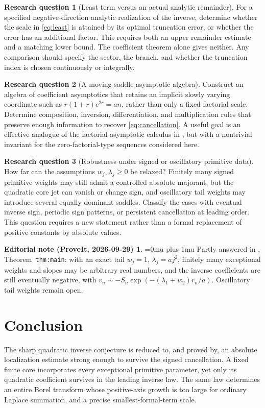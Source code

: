 \documentclass[11pt,a4paper]{article}
\numberwithin{equation}{section}
\theoremstyle{definition}\newtheorem{definition}[theorem]{Definition}
\newtheorem{question}{Research question}
\theoremstyle{remark}\newtheorem{remark}[theorem]{Remark}
\theoremstyle{definition}
\newtheorem*{ednoteinner}{Editorial note (ProveIt, 2026-09-29)}
\newenvironment{ednote}{\begin{ednoteinner}\sloppy\Urlmuskip=0mu plus 1mu\relax}{\end{ednoteinner}}
\begin{document}
\begin{question}[Least term versus an actual analytic remainder]
For a specified negative-direction analytic realization of the inverse,
determine whether the scale in \eqref{eq:least} is attained by its optimal
truncation error, or whether the error has an additional factor. This
requires both an upper remainder estimate and a matching lower bound.
The coefficient theorem alone gives neither. Any comparison should specify
the sector, the branch, and whether the truncation index is chosen
continuously or integrally.
\end{question}

\begin{question}[A moving-saddle asymptotic algebra]
Construct an algebra of coefficient asymptotics that retains an implicit
slowly varying coordinate such as \(r(1+r)e^{2r}=an\), rather than only a
fixed factorial scale. Determine composition, inversion, differentiation,
and multiplication rules that preserve enough information to recover
\eqref{eq:cancellation}. A useful goal is an effective analogue of the
factorial-asymptotic calculus in \cite{borinsky}, but with a nontrivial
invariant for the zero-factorial-type sequences considered here.
\end{question}

\begin{question}[Robustness under signed or oscillatory primitive data]
How far can the assumptions \(w_j,\lambda_j\ge0\) be relaxed? Finitely
many signed primitive weights may still admit a controlled absolute
majorant, but the quadratic core jet can vanish or change sign, and
oscillatory tail weights may introduce several equally dominant saddles.
Classify the cases with eventual inverse sign, periodic sign patterns, or
persistent cancellation at leading order. This question requires a new
statement rather than a formal replacement of positive constants by
absolute values.
\end{question}
\begin{ednote}
Partly answered in \cite{ed:sqi}, Theorem~\texttt{thm:main}: with an exact
tail \(w_j=1\), \(\lambda_j=aj^2\), finitely many exceptional weights and
slopes may be arbitrary real numbers, and the inverse coefficients are still
eventually negative, with \(v_n\sim-S_n\exp(-(\lambda_1+w_2)r_n/a)\).
Oscillatory tail weights remain open.
\end{ednote}

\section{Conclusion}
The sharp quadratic inverse conjecture is reduced to, and proved by, an
absolute localization estimate strong enough to survive the signed
cancellation. A fixed finite core incorporates every exceptional primitive
parameter, yet only its quadratic coefficient survives in the leading
inverse law. The same law determines an entire Borel transform whose
positive-axis growth is too large for ordinary Laplace summation, and a
precise smallest-formal-term scale.
\end{document}

